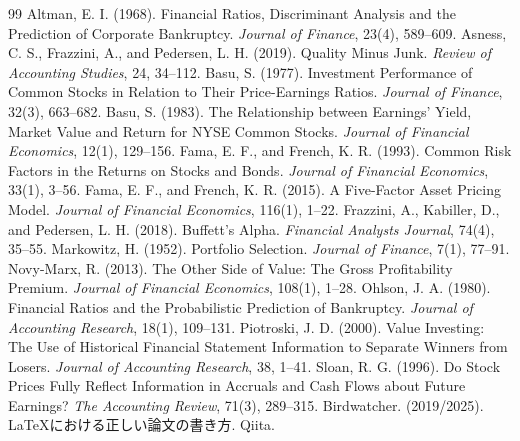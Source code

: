 \documentclass[11pt,a4paper]{article}
\begin{document}
\newpage
\begin{thebibliography}{99}
 Altman, E. I. (1968). Financial Ratios, Discriminant Analysis and the Prediction of Corporate Bankruptcy. \textit{Journal of Finance}, 23(4), 589--609.
 Asness, C. S., Frazzini, A., and Pedersen, L. H. (2019). Quality Minus Junk. \textit{Review of Accounting Studies}, 24, 34--112.
 Basu, S. (1977). Investment Performance of Common Stocks in Relation to Their Price-Earnings Ratios. \textit{Journal of Finance}, 32(3), 663--682.
 Basu, S. (1983). The Relationship between Earnings' Yield, Market Value and Return for NYSE Common Stocks. \textit{Journal of Financial Economics}, 12(1), 129--156.
 Fama, E. F., and French, K. R. (1993). Common Risk Factors in the Returns on Stocks and Bonds. \textit{Journal of Financial Economics}, 33(1), 3--56.
 Fama, E. F., and French, K. R. (2015). A Five-Factor Asset Pricing Model. \textit{Journal of Financial Economics}, 116(1), 1--22.
 Frazzini, A., Kabiller, D., and Pedersen, L. H. (2018). Buffett's Alpha. \textit{Financial Analysts Journal}, 74(4), 35--55.
 Markowitz, H. (1952). Portfolio Selection. \textit{Journal of Finance}, 7(1), 77--91.
 Novy-Marx, R. (2013). The Other Side of Value: The Gross Profitability Premium. \textit{Journal of Financial Economics}, 108(1), 1--28.
 Ohlson, J. A. (1980). Financial Ratios and the Probabilistic Prediction of Bankruptcy. \textit{Journal of Accounting Research}, 18(1), 109--131.
 Piotroski, J. D. (2000). Value Investing: The Use of Historical Financial Statement Information to Separate Winners from Losers. \textit{Journal of Accounting Research}, 38, 1--41.
 Sloan, R. G. (1996). Do Stock Prices Fully Reflect Information in Accruals and Cash Flows about Future Earnings? \textit{The Accounting Review}, 71(3), 289--315.
 Birdwatcher. (2019/2025). LaTeXにおける正しい論文の書き方. Qiita.
\end{thebibliography}
\end{document}
